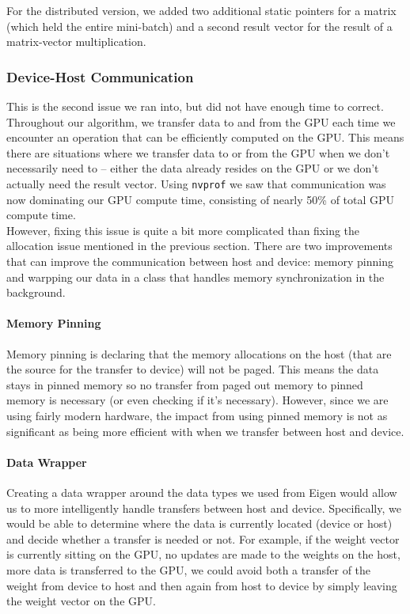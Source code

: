 \documentclass{article}
\begin{document}
For the distributed version, we added two additional static pointers for a
matrix (which held the entire mini-batch) and a second result vector for the
result of a matrix-vector multiplication. 

\subsubsection{Device-Host Communication}
This is the second issue we ran into, but did not have enough time to correct.
Throughout our algorithm, we transfer data to and from the GPU each time we
encounter an operation that can be efficiently computed on the GPU. This means
there are situations where we transfer data to or from the GPU when we don't
necessarily need to -- either the data already resides on the GPU or we don't
actually need the result vector. Using \texttt{nvprof} we saw that
communication was now dominating our GPU compute time, consisting of nearly
50\% of total GPU compute time.\\

However, fixing this issue is quite a bit more complicated than fixing the
allocation issue mentioned in the previous section. There are two improvements
that can improve the communication between host and device: memory pinning and
warpping our data in a class that handles memory synchronization in the
background.

\paragraph{Memory Pinning} Memory pinning is declaring that the memory
allocations on the host (that are the source for the transfer to device) will
not be paged. This means the data stays in pinned memory so no transfer from
paged out memory to pinned memory is necessary (or even checking if it's
necessary). However, since we are using fairly modern hardware, the impact from
using pinned memory is not as significant as being more efficient with when we
transfer between host and device.

\paragraph{Data Wrapper} Creating a data wrapper around the data types we used
from Eigen would allow us to more intelligently handle transfers between host
and device. Specifically, we would be able to determine where the data is
currently located (device or host) and decide whether a transfer is needed or
not. For example, if the weight vector is currently sitting on the GPU, no
updates are made to the weights on the host, more data is transferred to the
GPU, we could avoid both a transfer of the weight from device to host and then
again from host to device by simply leaving the weight vector on the GPU.
\end{document}
